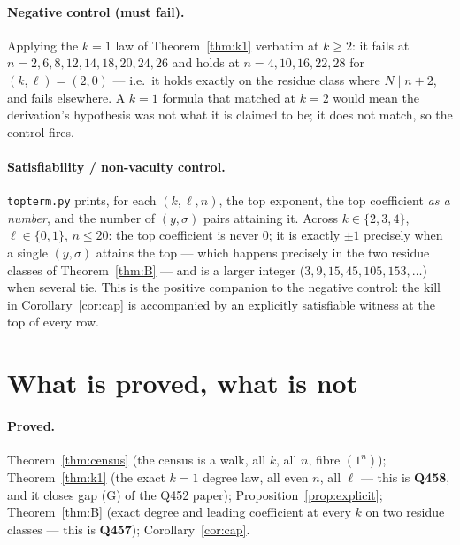 \documentclass[11pt]{article}
\theoremstyle{plain}
\theoremstyle{definition}
\theoremstyle{remark}
\newcommand{\onen}{(1^{n})}
\begin{document}
\paragraph{Negative control (must fail).} Applying the $k=1$ law of
Theorem~\ref{thm:k1} verbatim at $k\ge2$: it fails at $n=2,6,8,12,14,18,20,24,26$ and holds
at $n=4,10,16,22,28$ for $(k,\ell)=(2,0)$ --- i.e.\ it holds exactly on the residue class
where $N\mid n+2$, and fails elsewhere. A $k=1$ formula that matched at $k=2$ would mean
the derivation's hypothesis was not what it is claimed to be; it does not match, so the
control fires.

\paragraph{Satisfiability / non-vacuity control.} \texttt{topterm.py} prints, for each
$(k,\ell,n)$, the top exponent, the top coefficient \emph{as a number}, and the number of
$(y,\sigma)$ pairs attaining it. Across $k\in\{2,3,4\}$, $\ell\in\{0,1\}$, $n\le20$:
the top coefficient is never $0$; it is exactly $\pm1$ precisely when a single $(y,\sigma)$
attains the top --- which happens precisely in the two residue classes of
Theorem~\ref{thm:B} --- and is a larger integer ($3,9,15,45,105,153,\dots$) when several
tie. This is the positive companion to the negative control: the kill in
Corollary~\ref{cor:cap} is accompanied by an explicitly satisfiable witness at the top of
every row.

\section{What is proved, what is not}

\paragraph{Proved.}
Theorem~\ref{thm:census} (the census is a walk, all $k$, all $n$, fibre $\onen$);
Theorem~\ref{thm:k1} (the exact $k=1$ degree law, all even $n$, all $\ell$ --- this is
\textbf{Q458}, and it closes gap (G) of the Q452 paper); Proposition~\ref{prop:explicit};
Theorem~\ref{thm:B} (exact degree and leading coefficient at every $k$ on two residue
classes --- this is \textbf{Q457}); Corollary~\ref{cor:cap}.
\end{document}
